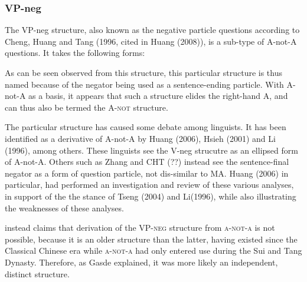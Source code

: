 \documentclass[12pt, UTF8]{article}
\begin{document}
\subsubsection{VP-neg}

The VP-neg structure, also known as the negative particle questions according to Cheng, Huang and Tang (1996, cited in Huang (2008)), is a sub-type of A-not-A questions. It takes the following forms:

\begin{exe}

\end{exe}

As can be seen observed from this structure, this particular structure is thus named because of the negator being used as a sentence-ending particle. With A-not-A as a basis, it appears that such a structure elides the right-hand A, and can thus also be termed the \textsc{A-not} structure.

The particular structure has caused some debate among linguists. It has been identified as a derivative of A-not-A by Huang (2006), Hsieh (2001) and Li (1996), among others. These linguists see the V-neg strucutre as an ellipsed form of A-not-A. Others such as Zhang and CHT (??) instead see the sentence-final negator as a form of question particle, not dis-similar to MA. Huang (2006) in particular, had performed an investigation and review of these various analyses, in support of the the stance of Tseng (2004) and Li(1996), while also illustrating the weaknesses of these analyses.

\cite{Gasde2001} instead claims that derivation of the \textsc{VP-neg} structure from \textsc{a-not-a} is not possible, because it is an older structure than the latter, having existed since the Classical Chinese era while \textsc{a-not-a} had only entered use during the Sui and Tang Dynasty. Therefore, as Gasde explained, it was more likely an independent, distinct structure.
\end{document}
